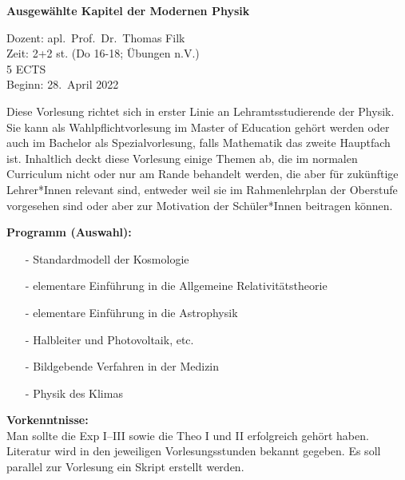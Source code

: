 \documentclass[german,12pt]{article}
\begin{document}
\textbf{Ausgew\"ahlte Kapitel der Modernen Physik}
\vspace{1cm}


Dozent: apl.\ Prof.\ Dr.\ Thomas Filk\\
Zeit: 2+2 st. (Do 16-18; \"Ubungen n.V.)\\
5 ECTS\\
Beginn: 28.\ April 2022

\thispagestyle{empty}
\vspace{1cm}

Diese Vorlesung richtet sich in erster Linie an Lehramtsstudierende der Physik. Sie kann als
Wahlpflichtvorlesung im Master of Education geh\"ort werden oder auch im Bachelor als
Spezialvorlesung, falls Mathematik das zweite Hauptfach ist. 
Inhaltlich deckt diese Vorlesung einige Themen ab, die im normalen Curriculum nicht
oder nur am Rande behandelt werden, die aber f\"ur zuk\"unftige Lehrer*Innen relevant
sind, entweder weil sie im Rahmenlehrplan der Oberstufe vorgesehen sind oder aber
zur Motivation der Sch\"uler*Innen beitragen k\"onnen. 
\vspace{1cm}

\textbf{Programm (Auswahl):}
\begin{itemize}
\item[-]
Standardmodell der Kosmologie
\item[-]
elementare Einf\"uhrung in die Allgemeine Relativit\"atstheorie
\item[-]
elementare Einf\"uhrung in die Astrophysik
\item[-]
Halbleiter und Photovoltaik, etc.
\item[-]
Bildgebende Verfahren in der Medizin    
\item[-]
Physik des Klimas
\end{itemize}   
\vspace{1cm}

\textbf{Vorkenntnisse:}\\[0.2cm]
Man sollte die Exp I--III sowie die Theo I und II erfolgreich geh\"ort haben. 
Literatur wird in den jeweiligen Vorlesungsstunden bekannt gegeben. Es soll
parallel zur Vorlesung ein Skript erstellt werden.
\end{document}
